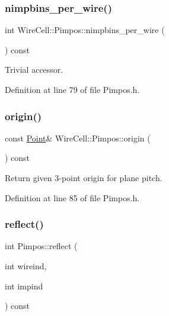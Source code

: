\subsubsection{\texorpdfstring{nimpbins\+\_\+per\+\_\+wire()}{nimpbins\_per\_wire()}}
{\footnotesize\ttfamily int Wire\+Cell\+::\+Pimpos\+::nimpbins\+\_\+per\+\_\+wire (\begin{DoxyParamCaption}{ }\end{DoxyParamCaption}) const\hspace{0.3cm}{\ttfamily [inline]}}



Trivial accessor. 



Definition at line 79 of file Pimpos.\+h.

\mbox{\label{class_wire_cell_1_1_pimpos_a9e7fe5e650d32ca5bc66bf69123e83f0}} 
\subsubsection{\texorpdfstring{origin()}{origin()}}
{\footnotesize\ttfamily const \hyperlink{namespace_wire_cell_ab2b2565fa6432efbb4513c14c988cda9}{Point}\& Wire\+Cell\+::\+Pimpos\+::origin (\begin{DoxyParamCaption}{ }\end{DoxyParamCaption}) const\hspace{0.3cm}{\ttfamily [inline]}}



Return given 3-\/point origin for plane pitch. 



Definition at line 85 of file Pimpos.\+h.

\mbox{\label{class_wire_cell_1_1_pimpos_a712e8a7789b061dd96f1e21f15ecdc42}} 
\subsubsection{\texorpdfstring{reflect()}{reflect()}}
{\footnotesize\ttfamily int Pimpos\+::reflect (\begin{DoxyParamCaption}\item[{int}]{wireind,  }\item[{int}]{impind }\end{DoxyParamCaption}) const}

